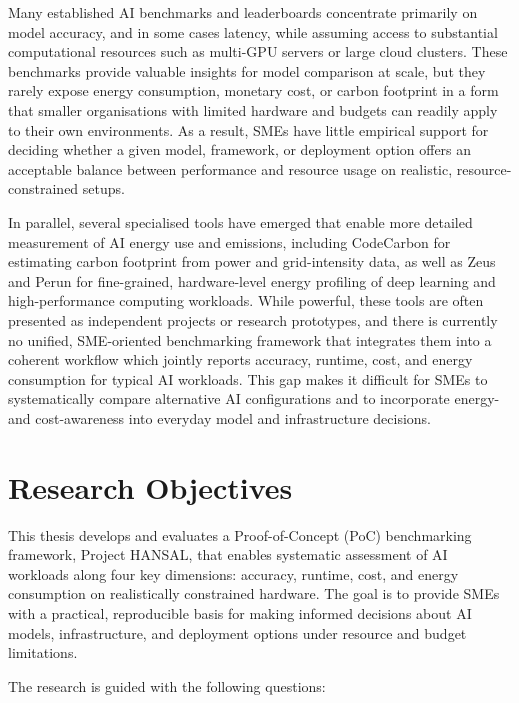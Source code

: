 Many established AI benchmarks and leaderboards concentrate primarily on model accuracy, and in 
some cases latency, while assuming access to substantial computational resources such as multi-GPU 
servers or large cloud clusters. These benchmarks provide valuable insights for model comparison at 
scale, but they rarely expose energy consumption, monetary cost, or carbon footprint in a form that 
smaller organisations with limited hardware and budgets can readily apply to their own environments. 
As a result, SMEs have little empirical support for deciding whether a given model, framework, or 
deployment option offers an acceptable balance between performance and resource usage on realistic, 
resource-constrained setups.

In parallel, several specialised tools have emerged that enable more detailed measurement of AI energy
use and emissions, including CodeCarbon for estimating carbon footprint from power and grid-intensity 
data, as well as Zeus and Perun for fine-grained, hardware-level energy profiling of deep learning and 
high-performance computing workloads. While powerful, these tools are often presented as independent 
projects or research prototypes, and there is currently no unified, SME-oriented benchmarking framework
that integrates them into a coherent workflow which jointly reports accuracy, runtime, cost, and energy
consumption for typical AI workloads. This gap makes it difficult for SMEs to systematically compare 
alternative AI configurations and to incorporate energy- and cost-awareness into everyday model and 
infrastructure decisions.

\section{Research Objectives}

This thesis develops and evaluates a Proof-of-Concept (PoC) benchmarking framework, Project HANSAL, 
that enables systematic assessment of AI workloads along four key dimensions: 
accuracy, runtime, cost, and energy consumption on realistically constrained 
hardware. The goal is to provide SMEs with a practical, reproducible basis for making informed decisions
about AI models, infrastructure, and deployment options under resource and budget limitations.  
  
The research is guided with the following questions:  

